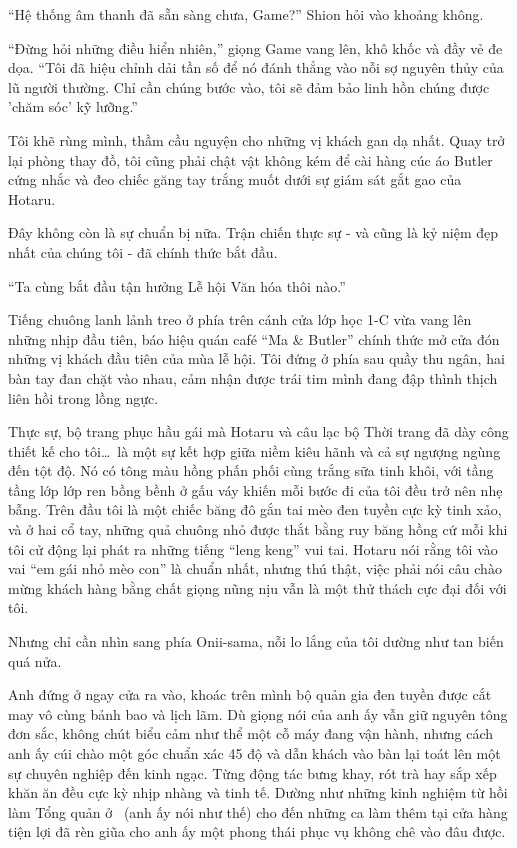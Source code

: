 \documentclass[../main.tex]{subfiles}
\begin{document}
``Hệ thống âm thanh đã sẵn sàng chưa, Game?'' Shion hỏi vào khoảng không.

``Đừng hỏi những điều hiển nhiên,'' giọng Game vang lên, khô khốc và đầy vẻ đe dọa. ``Tôi đã hiệu chỉnh dải tần số để nó đánh thẳng vào nỗi sợ nguyên thủy của lũ người thường. Chỉ cần chúng bước vào, tôi sẽ đảm bảo linh hồn chúng được 'chăm sóc' kỹ lưỡng.''

Tôi khẽ rùng mình, thầm cầu nguyện cho những vị khách gan dạ nhất. Quay trở lại phòng thay đồ, tôi cũng phải chật vật không kém để cài hàng cúc áo Butler cứng nhắc và đeo chiếc găng tay trắng muốt dưới sự giám sát gắt gao của Hotaru.

Đây không còn là sự chuẩn bị nữa. Trận chiến thực sự - và cũng là kỷ niệm đẹp nhất của chúng tôi - đã chính thức bắt đầu.

``Ta cùng bắt đầu tận hưởng Lễ hội Văn hóa thôi nào.''


Tiếng chuông lanh lảnh treo ở phía trên cánh cửa lớp học 1-C vừa vang lên những nhịp đầu tiên, báo hiệu quán café ``Ma \& Butler'' chính thức mở cửa đón những vị khách đầu tiên của mùa lễ hội. Tôi đứng ở phía sau quầy thu ngân, hai bàn tay đan chặt vào nhau, cảm nhận được trái tim mình đang đập thình thịch liên hồi trong lồng ngực.

Thực sự, bộ trang phục hầu gái mà Hotaru và câu lạc bộ Thời trang đã dày công thiết kế cho tôi\dots\ là một sự kết hợp giữa niềm kiêu hãnh và cả sự ngượng ngùng đến tột độ. Nó có tông màu hồng phấn phối cùng trắng sữa tinh khôi, với tầng tầng lớp lớp ren bồng bềnh ở gấu váy khiến mỗi bước đi của tôi đều trở nên nhẹ bẫng. Trên đầu tôi là một chiếc băng đô gắn tai mèo đen tuyền cực kỳ tinh xảo, và ở hai cổ tay, những quả chuông nhỏ được thắt bằng ruy băng hồng cứ mỗi khi tôi cử động lại phát ra những tiếng ``leng keng'' vui tai. Hotaru nói rằng tôi vào vai ``em gái nhỏ mèo con'' là chuẩn nhất, nhưng thú thật, việc phải nói câu chào mừng khách hàng bằng chất giọng nũng nịu vẫn là một thử thách cực đại đối với tôi.

Nhưng chỉ cần nhìn sang phía Onii-sama, nỗi lo lắng của tôi dường như tan biến quá nửa.

Anh đứng ở ngay cửa ra vào, khoác trên mình bộ quản gia đen tuyền được cắt may vô cùng bảnh bao và lịch lãm. Dù giọng nói của anh ấy vẫn giữ nguyên tông đơn sắc, không chút biểu cảm như thể một cỗ máy đang vận hành, nhưng cách anh ấy cúi chào một góc chuẩn xác 45 độ và dẫn khách vào bàn lại toát lên một sự chuyên nghiệp đến kinh ngạc. Từng động tác bưng khay, rót trà hay sắp xếp khăn ăn đều cực kỳ nhịp nhàng và tinh tế. Dường như những kinh nghiệm từ hồi làm Tổng quản ở \hll\ (anh ấy nói như thế) cho đến những ca làm thêm tại cửa hàng tiện lợi đã rèn giũa cho anh ấy một phong thái phục vụ không chê vào đâu được.
\end{document}
